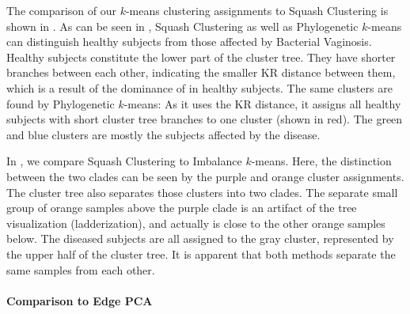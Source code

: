 The comparison of our $k$-means clustering assignments to Squash Clustering is shown in .
As can be seen in , Squash Clustering as well as
Phylogenetic $k$-means can distinguish healthy subjects from those affected by Bacterial Vaginosis.
Healthy subjects constitute the lower part of the cluster tree.
They have shorter branches between each other, indicating the smaller KR distance between them,
which is a result of the dominance of  in healthy subjects.
The same clusters are found by Phylogenetic $k$-means:
As it uses the KR distance, it assigns all healthy subjects with short cluster tree branches to one cluster (shown in red).
The green and blue clusters are mostly the subjects affected by the disease.

In , we compare Squash Clustering to Imbalance $k$-means.
Here, the distinction between the two  clades
can be seen by the purple and orange cluster assignments.
The cluster tree also separates those clusters into two clades.
The separate small group of orange samples above the purple clade is an artifact of the tree visualization (ladderization),
and actually is close to the other orange samples below.
The diseased subjects are all assigned to the gray cluster, represented by the upper half of the cluster tree.
It is apparent that both methods separate the same samples from each other.


\paragraph{Comparison to Edge PCA}
\label{ch:Clustering:sec:Results:sub:BVDataset:par:EdgePCA}

